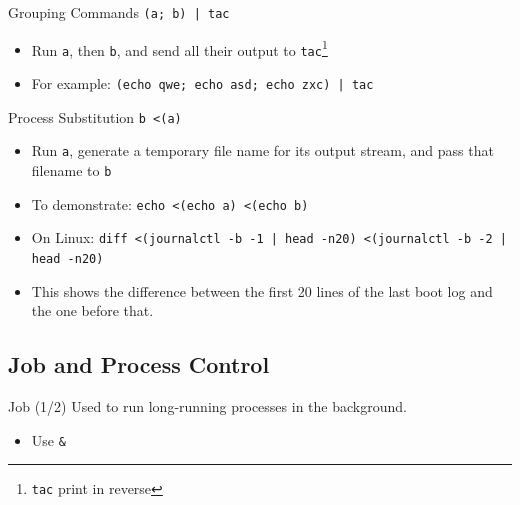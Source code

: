 \documentclass[12pt]{beamer}
\begin{document}
\begin{frame}[fragile]{Grouping Commands}
  \texttt{(a; b) | tac}
  \begin{itemize}
    \item Run \texttt{a}, then \texttt{b}, and send all their output to \texttt{tac}\footnote{\texttt{tac} print in reverse}
    \item For example: \texttt{(echo qwe; echo asd; echo zxc) | tac}
  \end{itemize}
\end{frame}

\begin{frame}[fragile]{Process Substitution}
  \texttt{b <(a)}
  \begin{itemize}
    \item Run \texttt{a}, generate a temporary file name for its output stream, and pass that filename to \texttt{b}
    \item To demonstrate: \texttt{echo <(echo a) <(echo b)}
    \item On Linux: \texttt{diff <(journalctl -b -1 | head -n20) <(journalctl -b -2 | head -n20)}
    \item This shows the difference between the first 20 lines of the last boot log and the one before that.
  \end{itemize}
\end{frame}

\subsection{Job and Process Control}
\begin{frame}[fragile]{Job (1/2)}
  Used to run long-running processes in the background.
  \begin{itemize}
    \item Use \texttt{&}
  \end{itemize}
\end{frame}
\end{document}
